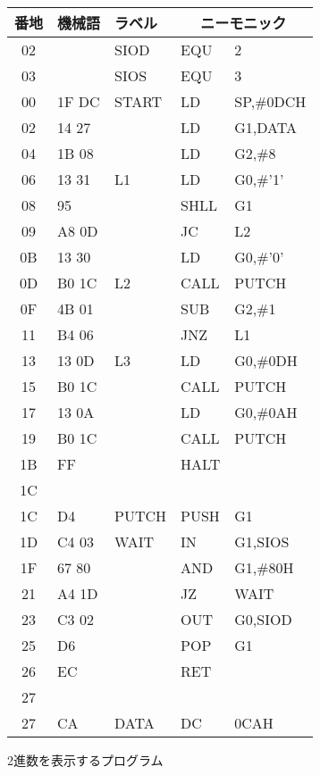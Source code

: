 \begin{figure}
{\small\tt\begin{center}
\begin{tabular}{|c|l|l|l l |} \hline
番地 & 機械語 & ラベル & \multicolumn{2}{|c|}{ニーモニック} \\
\hline
02 &       & SIOD   & EQU    & 2                 \\
03 &       & SIOS   & EQU    & 3                 \\
00 & 1F DC & START  & LD     & SP,\#0DCH         \\
02 & 14 27 &        & LD     & G1,DATA           \\
04 & 1B 08 &        & LD     & G2,\#8            \\
06 & 13 31 & L1     & LD     & G0,\#'1'          \\
08 & 95    &        & SHLL   & G1                \\
09 & A8 0D &        & JC     & L2                \\
0B & 13 30 &        & LD     & G0,\#'0'          \\
0D & B0 1C & L2     & CALL   & PUTCH             \\
0F & 4B 01 &        & SUB    & G2,\#1            \\
11 & B4 06 &        & JNZ    & L1                \\
13 & 13 0D & L3     & LD     & G0,\#0DH          \\
15 & B0 1C &        & CALL   & PUTCH             \\
17 & 13 0A &        & LD     & G0,\#0AH          \\
19 & B0 1C &        & CALL   & PUTCH             \\
1B & FF    &        & HALT   &                   \\
1C &       &        &        &                   \\
1C & D4    & PUTCH  & PUSH   & G1                \\
1D & C4 03 & WAIT   & IN     & G1,SIOS           \\
1F & 67 80 &        & AND    & G1,\#80H          \\
21 & A4 1D &        & JZ     & WAIT              \\
23 & C3 02 &        & OUT    & G0,SIOD           \\
25 & D6    &        & POP    & G1                \\
26 & EC    &        & RET    &                   \\
27 &       &        &        &                   \\
27 & CA    & DATA   & DC     & 0CAH              \\
\hline
\end{tabular}
\end{center}}
\caption{2進数を表示するプログラム}
\label{fig:chap6:bin}
\end{figure}

